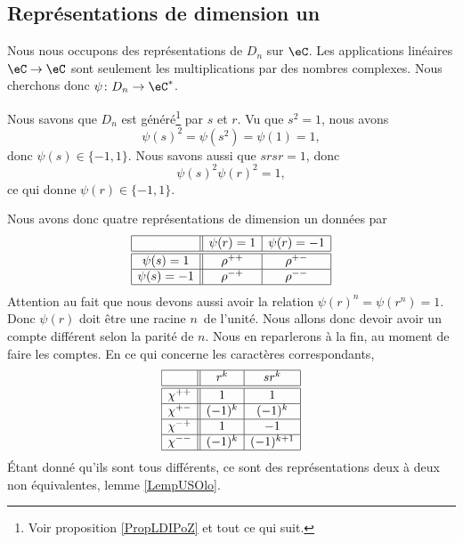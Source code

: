 \subsection{Représentations de dimension un}

Nous nous occupons des représentations de \( D_n\) sur \( \eC\). Les applications linéaires \( \eC\to \eC\) sont seulement les multiplications par des nombres complexes. Nous cherchons donc \( \psi\colon D_n\to \eC^*\).

Nous savons que \( D_n\) est généré\footnote{Voir proposition \ref{PropLDIPoZ} et tout ce qui suit.} par \( s\) et \( r\). Vu que \( s^2=1\), nous avons
\begin{equation}
    \psi(s)^2=\psi(s^2)=\psi(1)=1,
\end{equation}
donc \( \psi(s)\in\{ -1,1 \}\). Nous savons aussi que \( srsr=1\), donc
\begin{equation}
    \psi(s)^2\psi(r)^2=1,
\end{equation}
ce qui donne \( \psi(r)\in\{ -1,1 \}\).

Nous avons donc quatre représentations de dimension un données par
\begin{equation*}
    \begin{array}[]{|c||c|c|}
        \hline
        &\psi(r)=1&\psi(r)=-1\\
        \hline\hline
        \psi(s)=1&\rho^{++}&\rho^{+-}\\
        \hline
        \psi(s)=-1&\rho^{-+}&\rho^{--}\\
        \hline
    \end{array}
\end{equation*}
Attention au fait que nous devons aussi avoir la relation \( \psi(r)^n=\psi(r^n)=1\). Donc \( \psi(r)\) doit être une racine \( n\)\ieme\ de l'unité. Nous allons donc devoir avoir un compte différent selon la parité de \( n\). Nous en reparlerons à la fin, au moment de faire les comptes. En ce qui concerne les caractères correspondants,
\begin{equation*}
    \begin{array}[]{|c||c|c|}
        \hline
        &r^k&sr^k\\
        \hline\hline
        \chi^{++}&1&1\\
        \hline
        \chi^{+-}&(-1)^k&(-1)^k\\
        \hline
        \chi^{-+}&1&-1\\
        \hline
        \chi^{--}&(-1)^k&(-1)^{k+1}\\
        \hline
    \end{array}
\end{equation*}
Étant donné qu'ils sont tous différents, ce sont des représentations deux à deux non équivalentes, lemme \ref{LempUSOlo}.

